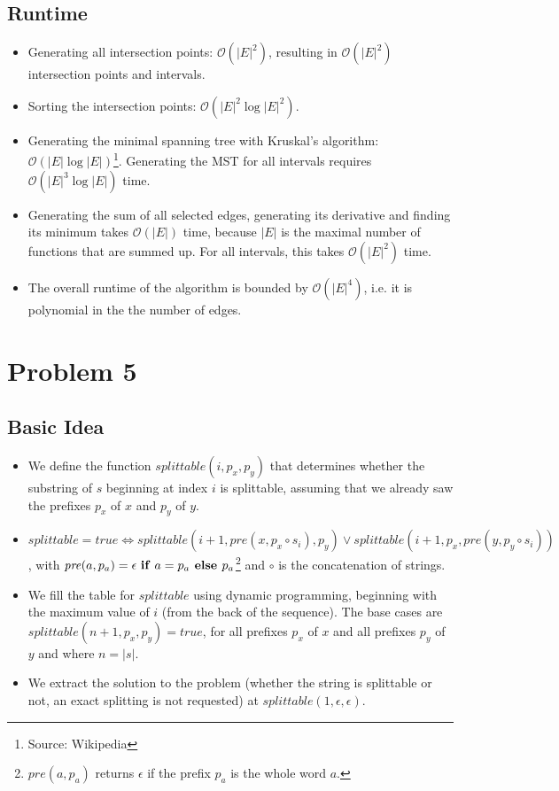 \documentclass[12pt]{article}
\begin{document}
\subsection*{Runtime}
\begin{itemize}
	\item Generating all intersection points: $\mathcal{O}(|E|^2)$, resulting in $\mathcal{O}(|E|^2)$ intersection points and intervals.
	\item Sorting the intersection points: $\mathcal{O}(|E|^2 \log |E|^2)$.
	\item Generating the minimal spanning tree with Kruskal's algorithm: $\mathcal{O}(|E| \log |E|)$\footnote{Source: Wikipedia}. Generating the MST for all intervals requires $\mathcal{O}(|E|^3 \log |E|)$ time.
	\item Generating the sum of all selected edges, generating its derivative and finding its minimum takes $\mathcal{O}(|E|)$ time, because $|E|$ is the maximal number of functions that are summed up. For all intervals, this takes $\mathcal{O}(|E|^2)$ time.
	\item The overall runtime of the algorithm is bounded by $\mathcal{O}(|E|^4)$, i.e. it is polynomial in the the number of edges.
\end{itemize}

\section*{Problem 5}
\subsection*{Basic Idea}
\begin{itemize}
	\item We define the function $\mathit{splittable}(i, p_x, p_y)$ that determines whether the substring of $s$ beginning at index $i$ is splittable, assuming that we already saw the prefixes $p_x$ of $x$ and $p_y$ of $y$.
	\item $\mathit{splittable} = \mathit{true} \Leftrightarrow \mathit{splittable}(i+1, \mathit{pre}(x, p_x \circ s_i), p_y) \vee \mathit{splittable}(i+1, p_x, \mathit{pre}(y, p_y \circ s_i))$, with $\mathit{pre}(a, p_a) = \epsilon \mbox{ \textbf{if} } a = p_a \mbox{\textbf{ else }} p_a$\footnote{$\mathit{pre}(a, p_a)$ returns $\epsilon$ if the prefix $p_a$ is the whole word $a$.} and $\circ$ is the concatenation of strings.
	\item We fill the table for $\mathit{splittable}$ using dynamic programming, beginning with the maximum value of $i$ (from the back of the sequence). The base cases are $\mathit{splittable}(n+1, p_x, p_y) = \mathit{true}$, for all prefixes $p_x$ of $x$ and all prefixes $p_y$ of $y$ and where $n = |s|$.
	\item We extract the solution to the problem (whether the string is splittable or not, an exact splitting is not requested) at $\mathit{splittable}(1, \epsilon, \epsilon)$.
\end{itemize}
\end{document}
